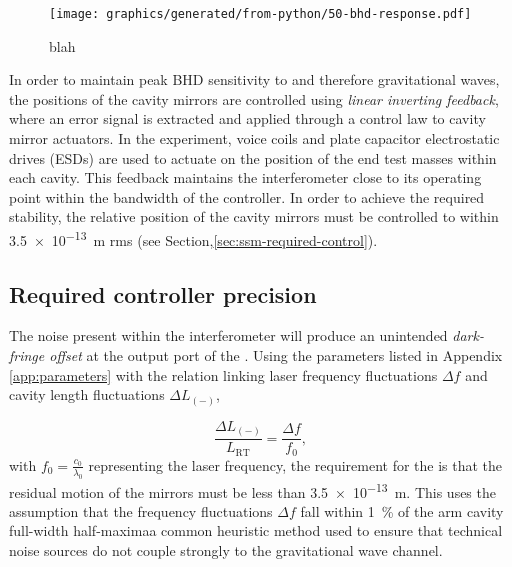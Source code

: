 \begin{figure}
  \centering
  \texttt{[image: graphics/generated/from-python/50-bhd-response.pdf]}
  \caption{\label{fig:bhd-response}blah}
\end{figure}

In order to maintain peak \gls{BHD} sensitivity to \LMINUS{} and therefore gravitational waves, the positions of the cavity mirrors are controlled using \emph{linear inverting feedback}, where an error signal is extracted and applied through a control law to cavity mirror actuators. In the experiment, voice coils and plate capacitor electrostatic drives (\glspl{ESD}) \cite{Wittel2015} are used to actuate on the position of the end test masses within each cavity. This feedback maintains the interferometer close to its operating point within the bandwidth of the controller. In order to achieve the required stability, the relative position of the cavity mirrors must be controlled to within \SI{3.5e-13}{\meter} rms (see Section,\ref{sec:ssm-required-control}).
   

\subsection{\label{sec:ssm-required-control}Required controller precision}

The noise present within the interferometer will produce an unintended \emph{dark-fringe offset} at the output port of the \SSM{}. Using the parameters listed in Appendix\,\ref{app:parameters} with the relation linking laser frequency fluctuations $\Delta f$ and cavity length fluctuations $\Delta L_{\left(-\right)}$,

\begin{equation}
  \frac{\Delta L_{\left(-\right)}}{L_{\textrm{RT}}} = \frac{\Delta f}{f_{0}},
\end{equation}
with $f_{0} = \frac{c_{0}}{\lambda_{0}}$ representing the laser frequency, the requirement for the \SSM{} is that the residual motion of the mirrors must be less than \SI{3.5e-13}{\meter}. This uses the assumption that the frequency fluctuations $\Delta f$ fall within \SI{1}{\percent} of the arm cavity full-width half-maxima\textemdash a common heuristic method used to ensure that technical noise sources do not couple strongly to the gravitational wave channel.

